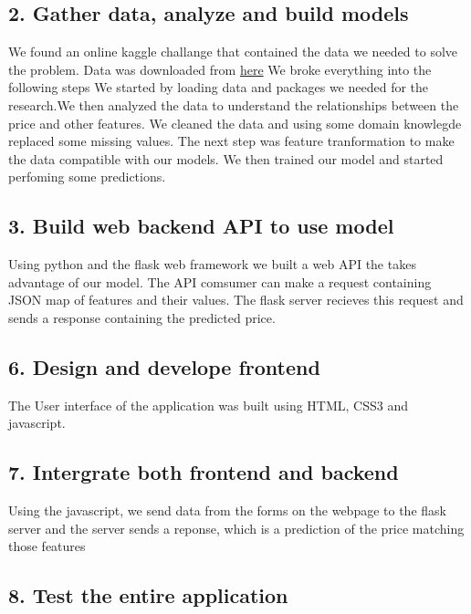 \subsection{2. Gather data, analyze and build
models}\label{gather-data-analyze-and-build-models}

We found an online kaggle challange that contained the data we needed to
solve the problem. Data was downloaded from
\href{https://www.kaggle.com/c/house-prices-advanced-regression-techniques/data}{here}
We broke everything into the following steps We started by loading data
and packages we needed for the research.We then analyzed the data to
understand the relationships between the price and other features. We
cleaned the data and using some domain knowlegde replaced some missing
values. The next step was feature tranformation to make the data
compatible with our models. We then trained our model and started
perfoming some predictions.

\subsection{3. Build web backend API to use
model}\label{build-web-backend-api-to-use-model}

Using python and the flask web framework we built a web API the takes
advantage of our model. The API comsumer can make a request containing
JSON map of features and their values. The flask server recieves this
request and sends a response containing the predicted price.

\subsection{6. Design and develope
frontend}\label{design-and-develope-frontend}

The User interface of the application was built using HTML, CSS3 and
javascript.

\subsection{7. Intergrate both frontend and
backend}\label{intergrate-both-frontend-and-backend}

Using the javascript, we send data from the forms on the webpage to the
flask server and the server sends a reponse, which is a prediction of
the price matching those features

\subsection{8. Test the entire
application}\label{test-the-entire-application}

